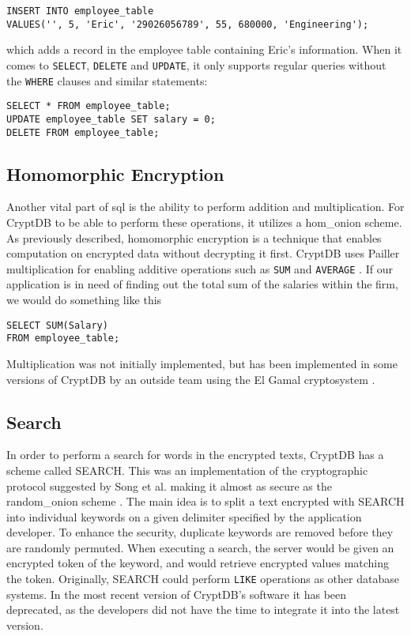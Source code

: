 \begin{verbatim}
INSERT INTO employee_table
VALUES('', 5, 'Eric', '29026056789', 55, 680000, 'Engineering');
\end{verbatim}

\noindent
which adds a record in the employee table containing Eric's information. When it comes to \verb!SELECT!, \verb!DELETE! and \verb!UPDATE!, it only supports regular queries without the \verb!WHERE! clauses and similar statements:

\begin{verbatim}
SELECT * FROM employee_table;
UPDATE employee_table SET salary = 0;
DELETE FROM employee_table;
\end{verbatim}



\subsection{Homomorphic Encryption}

Another vital part of \Gls{sql} is the ability to perform addition and multiplication. For CryptDB to be able to perform these operations, it utilizes a \Gls{hom_onion} scheme. As previously described, homomorphic encryption is a technique that enables computation on encrypted data without decrypting it first. CryptDB uses Pailler multiplication for enabling additive operations such as \verb!SUM! and \verb!AVERAGE! \cite{Paillier}. If our application is in need of finding out the total sum of the salaries within the firm, we would do something like this

\begin{verbatim}
SELECT SUM(Salary)
FROM employee_table;
\end{verbatim}

\noindent
Multiplication was not initially implemented, but has been implemented in some versions of CryptDB by an outside team using the El Gamal cryptosystem \cite{cryptdb_guidelines}. 



\subsection{Search}

In order to perform a search for words in the encrypted texts, CryptDB has a scheme called SEARCH. This was an implementation of the cryptographic protocol suggested by Song et al. making it almost as secure as the \gls{random_onion} scheme \citep{CryptDB_Main_Paper}. The main idea is to split a text encrypted with SEARCH into individual keywords on a given delimiter specified by the application developer. To enhance the security, duplicate keywords are removed before they are randomly permuted. When executing a search, the server would be given an encrypted token of the keyword, and would retrieve encrypted values matching the token. Originally, SEARCH could perform \texttt{LIKE} operations as other database systems. In the most recent version of CryptDB's software it has been deprecated, as the developers did not have the time to integrate it into the latest version.


